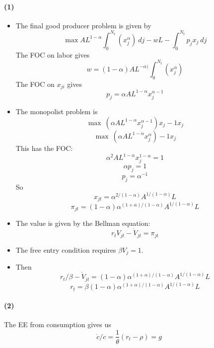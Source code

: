 \documentclass[10pt,letter]{article}
\newcommand{\problempart}[1]{\paragraph{#1}}
\begin{document}
\problempart{(1)}
\begin{itemize}
  \item The final good producer problem is given by
  \[ \max AL^{1-\alpha} \int_0^{N_t}(x_{j}^\alpha) \ dj - wL - \int_0^{N_t} p_j x_{j} \ dj \]
  The FOC on labor gives
  \[ w = (1-\alpha)AL^{-\alpha) }\int_0^{N_t}(x_{j}^\alpha)  \]
  The FOC on $x_{ji}$ gives
  \[ p_j = \alpha AL^{1-\alpha}x_{j}^{\alpha - 1} \]
  \item The monopolist problem is
  \[ \max \ (\alpha AL^{1-\alpha}x_{j}^{\alpha - 1}) x_{j} - 1 x_{j} \]
  \[ \max \ (\alpha AL^{1-\alpha}x_{j}^{\alpha}) - 1 x_{j} \]
  This has the FOC:
  \[ \alpha^2 AL^{1-\alpha} x_j^{1-\alpha} = 1 \]
  \[ \alpha p_j = 1 \]
  \[ p_j = \alpha^{-1} \]
  So
  \[ x_{jt} = \alpha^{2/(1-\alpha)}A^{1/(1-\alpha)}L \]
  \[ \pi_{jt} = (1-\alpha)\alpha^{(1+\alpha)/(1-\alpha)}A^{1/(1-\alpha)}L \]
  \item The value is given by the Bellman equation:
  \[ r_t V_{jt} - \dot{V}_{jt} = \pi_{jt}  \]
  \item The free entry condition requires $\beta V_j = 1 $.
  \item Then
   \[ r_t/\beta - \dot{V}_{jt} = (1-\alpha)\alpha^{(1+\alpha)/(1-\alpha)}A^{1/(1-\alpha)}L  \]
    \[ r_t = \beta(1-\alpha)\alpha^{(1+\alpha)/(1-\alpha)}A^{1/(1-\alpha)}L  \]
\end{itemize}
\problempart{(2)}
The EE from consumption gives us
\[ \dot{c}/c = \frac{1}{\theta}(r_t-\rho) = g \]
\end{document}

